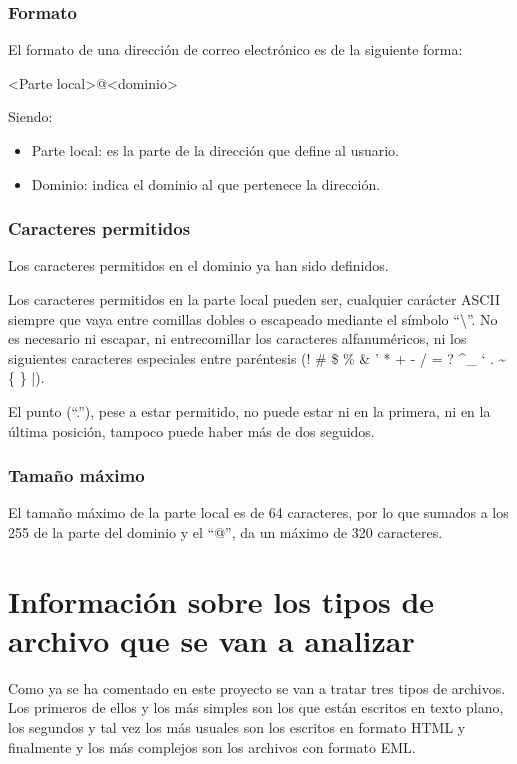 \subsubsection{Formato}
El formato de una dirección de correo electrónico es de la siguiente forma: 

<Parte local>@<dominio>

Siendo:
\begin{itemize}
    \item Parte local: es la parte de la dirección que define al usuario.
    \item Dominio: indica el dominio al que pertenece la dirección.
\end{itemize} 

\subsubsection{Caracteres permitidos}
Los caracteres permitidos en el dominio ya han sido definidos.

Los caracteres permitidos en la parte local pueden ser, cualquier carácter ASCII siempre que vaya entre comillas dobles o escapeado mediante el símbolo “\textbackslash”. No es necesario ni escapar, ni entrecomillar los caracteres alfanuméricos, ni los siguientes caracteres especiales entre paréntesis (! \# \$ \% \& ' * + - / = ?  \textasciicircum \_ ` . \textasciitilde \{ \} |).

El punto (“.”), pese a estar permitido, no puede estar ni en la primera, ni en la última posición, tampoco puede haber más de dos seguidos. 

\subsubsection{Tamaño máximo}
El tamaño máximo de la parte local es de 64 caracteres, por lo que sumados a los 255 de la parte del dominio y el “@”, da un máximo de 320 caracteres. 

\section{Información sobre los tipos de archivo que se van a analizar}
Como ya se ha comentado en este proyecto se van a tratar tres tipos de archivos. Los primeros de ellos y los más simples son los que están escritos en texto plano, los segundos y tal vez los más usuales son los escritos en formato HTML y finalmente y los más complejos son los archivos con formato EML.


